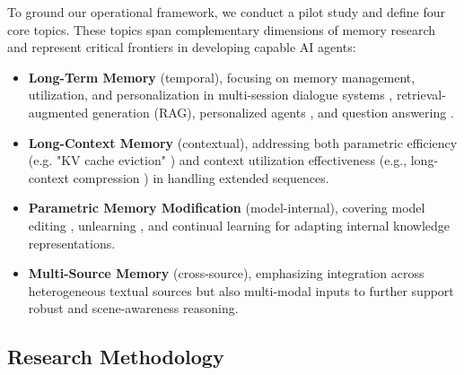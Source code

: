 \documentclass[manuscript,screen]{acmart}
\begin{document}
To ground our operational framework, we conduct a pilot study and define four core topics. These topics span complementary dimensions of memory research and represent critical frontiers in developing capable AI agents:

\begin{itemize}
    \item \textbf{Long-Term Memory} (temporal), focusing on memory management, utilization, and personalization in multi-session dialogue systems \citep{xu2021beyond, maharana2024evaluating}, retrieval-augmented generation (RAG), personalized agents \citep{li2024hello}, and question answering   \citep{wu2024longmemeval, zhong2024memorybank}.
    
    \item \textbf{Long-Context Memory} (contextual), addressing both parametric efficiency (e.g. "KV cache eviction" \citep{zhang2023ho}) and context utilization effectiveness (e.g., long-context compression \citep{cheng2024xrag, jiang-etal-2024-longllmlingua}) in handling extended sequences.
    
    \item \textbf{Parametric Memory Modification} (model-internal), covering model editing \citep{fang2025alphaedit, meng2022mass, wang2024wise}, unlearning \citep{maini2024tofu}, and continual learning \citep{wang2024towards} for adapting internal knowledge representations.
    
    \item \textbf{Multi-Source Memory} (cross-source), emphasizing integration across heterogeneous textual sources \citep{hu2023chatdb} but also multi-modal inputs \citep{wang2025new} to further support robust and scene-awareness reasoning.
\end{itemize}


\subsection{Research Methodology}
\end{document}
